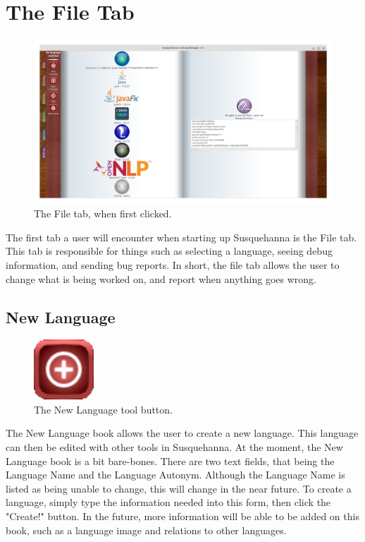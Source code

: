 \documentclass{report}
\begin{document}
	\chapter{The File Tab}
	\begin{figure}[ht]
		\centering
		\includegraphics[width=1\linewidth]{img/file-tab}
		\caption{The File tab, when first clicked.}
		\label{fig:file-tab}
	\end{figure}
	The first tab a user will encounter when starting up Susquehanna is the File tab. This tab is responsible for things such as selecting a language, seeing debug information, and sending bug reports. In short, the file tab allows the user to change what is being worked on, and report when anything goes wrong.
	\newpage
	\section{New Language}
	\begin{figure}
		\centering
		\includegraphics[width=0.2\textwidth]{img/new-language}
		\caption{The New Language tool button.}
		\label{fig:new-language}
	\end{figure}
	The New Language book allows the user to create a new language. This language can then be edited with other tools in Susquehanna. At the moment, the New Language book is a bit bare-bones. There are two text fields, that being the Language Name and the Language Autonym. Although the Language Name is listed as being unable to change, this will change in the near future. To create a language, simply type the information needed into this form, then click the "Create!" button. In the future, more information will be able to be added on this book, such as a language image and relations to other languages.
\end{document}
